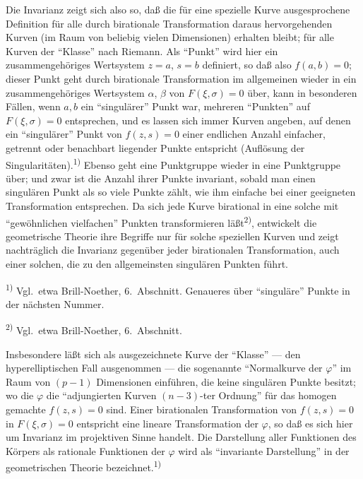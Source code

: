 \documentclass[12pt,a4paper]{article}
\begin{document}
Die Invarianz zeigt sich also so, da\ss{} die f\"ur eine spezielle Kurve ausgesprochene Definition f\"ur alle durch birationale Transformation daraus hervorgehenden Kurven (im Raum von beliebig vielen Dimensionen) erhalten bleibt; f\"ur alle Kurven der ``Klasse'' nach Riemann. Als ``Punkt'' wird hier ein zusammengeh\"origes Wertsystem $z=a$, $s=b$ definiert, so da\ss{} also $f(a,b)=0$; dieser Punkt geht durch birationale Transformation im allgemeinen wieder in ein zusammengeh\"origes Wertsystem $\alpha$, $\beta$ von $F(\xi,\sigma)=0$ \"uber, kann in besonderen F\"allen, wenn $a,b$ ein ``singul\"arer'' Punkt war, mehreren ``Punkten'' auf $F(\xi,\sigma)=0$ entsprechen, und es lassen sich immer Kurven angeben, auf denen ein ``singul\"arer'' Punkt von $f(z,s)=0$ einer endlichen Anzahl einfacher, getrennt oder benachbart liegender Punkte entspricht (Aufl\"osung der Singularit\"aten).\textsuperscript{1)} Ebenso geht eine Punktgruppe wieder in eine Punktgruppe \"uber; und zwar ist die Anzahl ihrer Punkte invariant, sobald man einen singul\"aren Punkt als so viele Punkte z\"ahlt, wie ihm einfache bei einer geeigneten Transformation entsprechen. Da sich jede Kurve birational in eine solche mit ``gew\"ohnlichen vielfachen'' Punkten transformieren l\"a\ss{}t\textsuperscript{2)}, entwickelt die geometrische Theorie ihre Begriffe nur f\"ur solche speziellen Kurven und zeigt nachtr\"aglich die Invarianz gegen\"uber jeder birationalen Transformation, auch einer solchen, die zu den allgemeinsten singul\"aren Punkten f\"uhrt.

\smallskip
\noindent\textsuperscript{1)} Vgl.\ etwa Brill-Noether, 6.\ Abschnitt. Genaueres \"uber ``singul\"are'' Punkte in der n\"achsten Nummer.

\smallskip
\noindent\textsuperscript{2)} Vgl.\ etwa Brill-Noether, 6.\ Abschnitt.

Insbesondere l\"a\ss{}t sich als ausgezeichnete Kurve der ``Klasse'' --- den hyperelliptischen Fall ausgenommen --- die sogenannte ``Normalkurve der $\varphi$'' im Raum von $(p-1)$ Dimensionen einf\"uhren, die keine singul\"aren Punkte besitzt; wo die $\varphi$ die ``adjungierten Kurven $(n-3)$-ter Ordnung'' f\"ur das homogen gemachte $f(z,s)=0$ sind. Einer birationalen Transformation von $f(z,s)=0$ in $F(\xi,\sigma)=0$ entspricht eine lineare Transformation der $\varphi$, so da\ss{} es sich hier um Invarianz im projektiven Sinne handelt. Die Darstellung aller Funktionen des K\"orpers als rationale Funktionen der $\varphi$ wird als ``invariante Darstellung'' in der geometrischen Theorie bezeichnet.\textsuperscript{1)}
\end{document}
